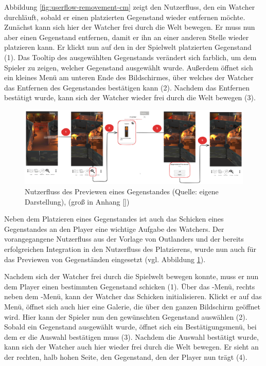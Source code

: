 Abbildung \ref{fig:userflow-removement-cm} zeigt den Nutzerfluss, den ein Watcher durchläuft, sobald er einen platzierten Gegenstand wieder entfernen möchte. Zunächst kann sich hier der Watcher frei durch die Welt bewegen. Er muss nun aber einen Gegenstand entfernen, damit er ihn an einer anderen Stelle wieder platzieren kann. Er klickt nun auf den in der Spielwelt platzierten Gegenstand (1). Das Tooltip des ausgewählten Gegenstands verändert sich farblich, um dem Spieler zu zeigen, welcher Gegenstand ausgewählt wurde. Außerdem öffnet sich ein kleines Menü am unteren Ende des Bildschirmes, über welches der Watcher das Entfernen des Gegenstandes bestätigen kann (2). Nachdem das Entfernen bestätigt wurde, kann sich der Watcher wieder frei durch die Welt bewegen (3).

\begin{figure}[ht]
\centering
\includegraphics[width=1\linewidth]{content/pictures/PreviewFlow.png}
\caption{Nutzerfluss des Previewen eines Gegenstandes (Quelle: eigene Darstellung), (groß in Anhang \ref{})}
\label{fig:userflow-preview-cm}
\end{figure}

Neben dem Platzieren eines Gegenstandes ist auch das Schicken eines Gegenstandes an den Player eine wichtige Aufgabe des Watchers. Der vorangegangene Nutzerfluss aus der Vorlage von Outlanders und der bereits erfolgreichen Integration in den Nutzerfluss des Platzierens, wurde nun auch für das Previewen von Gegenständen eingesetzt (vgl. Abbildung \ref{fig:userflow-preview-cm}).

Nachdem sich der Watcher frei durch die Spielwelt bewegen konnte, muss er nun dem Player einen bestimmten Gegenstand schicken (1). Über das -Menü, rechts neben dem -Menü, kann der Watcher das Schicken initialisieren. Klickt er auf das Menü, öffnet sich auch hier eine Galerie, die über den ganzen Bildschirm geöffnet wird. Hier kann der Spieler nun den gewünschten Gegenstand auswählen (2). Sobald ein Gegenstand ausgewählt wurde, öffnet sich ein Bestätigungsmenü, bei dem er die Auswahl bestätigen muss (3). Nachdem die Auswahl bestätigt wurde, kann sich der Watcher auch hier wieder frei durch die Welt bewegen. Er sieht an der rechten, halb hohen Seite, den Gegenstand, den der Player nun trägt (4).

